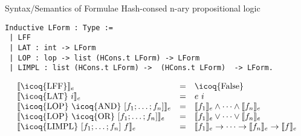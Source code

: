 \documentclass{beamer}
\newcommand{\mcoq}[1]{\mbox{\icoq{#1}}}
\begin{document}
\begin{frame}[fragile]{Syntax/Semantics of Formulae}
Hash-consed n-ary propositional logic
\begin{verbatim}
Inductive LForm : Type :=
 | LFF
 | LAT : int -> LForm
 | LOP : lop -> list (HCons.t LForm) -> LForm
 | LIMPL : list (HCons.t LForm) ->  (HCons.t LForm)  -> LForm.
\end{verbatim}
\bigskip

\[
  \begin{array}{lcl}
    \llbracket \mcoq{LFF} \rrbracket_e &=& \mcoq{False} \\
    \llbracket \mcoq{LAT}\ i \rrbracket_e &=& e\ i \\
    \llbracket \mcoq{LOP}\  \mcoq{AND}\ [f_1;\dots;f_n] \rrbracket_e &=& \llbracket f_1 \rrbracket_e \land \dots\land \llbracket f_n \rrbracket_e\\
    \llbracket \mcoq{LOP}\  \mcoq{OR}\  [f_1;\dots;f_n] \rrbracket_e &=& %
    \llbracket f_1 \rrbracket_e \vee \dots\vee \llbracket f_n \rrbracket_e\\
    \llbracket \mcoq{LIMPL}\ [f_1;\dots;f_n]\  f \rrbracket_e &=& \llbracket f_1\rrbracket_e \rightarrow \dots \rightarrow \llbracket f_n \rrbracket_e \to \llbracket f \rrbracket_e \\
  \end{array}
\]

\end{frame}
\end{document}
